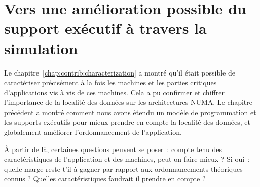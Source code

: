 \chapter{Vers une amélioration possible du support exécutif à travers la simulation}\label{chap:simulation}
\chaptertoc


Le chapitre~\ref{chap:contrib:characterization} a montré qu'il était possible de caractériser précisément à la fois les machines et les parties critiques d'applications vis à vis de ces machines.
Cela a pu confirmer et chiffrer l'importance de la localité des données sur les architectures NUMA.
Le chapitre précédent a montré comment nous avons étendu un modèle de programmation et les supports exécutifs pour mieux prendre en compte la localité des données, et globalement améliorer l'ordonnancement de l'application.

À partir de là, certaines questions peuvent se poser~: compte tenu des caractéristiques de l'application et des machines, peut on faire mieux ?
Si oui~: quelle marge reste-t'il à gagner par rapport aux ordonnancements théoriques connus ? Quelles caractéristiques faudrait il prendre en compte ?

